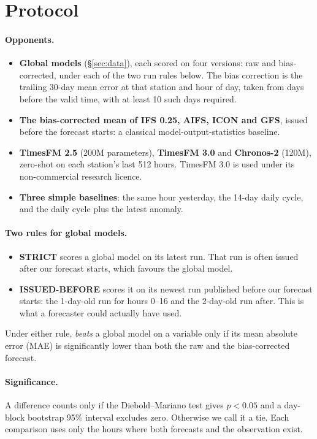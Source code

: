 \section{Protocol}\label{sec:protocol}

\paragraph{Opponents.}
\begin{itemize}
\item \textbf{Global models} (\S\ref{sec:data}), each scored on four versions: raw and bias-corrected, under each of
the two run rules below. The bias correction is the trailing 30-day mean error at that station and hour of day,
taken from days before the valid time, with at least 10 such days required.
\item \textbf{The bias-corrected mean of IFS 0.25, AIFS, ICON and GFS}, issued before the forecast starts: a
classical model-output-statistics baseline.
\item \textbf{TimesFM 2.5} (200M parameters), \textbf{TimesFM 3.0} and \textbf{Chronos-2} (120M), zero-shot on each
station's last 512 hours. TimesFM 3.0 is used under its non-commercial research licence.
\item \textbf{Three simple baselines}: the same hour yesterday, the 14-day daily cycle, and the daily cycle plus the
latest anomaly.
\end{itemize}

\paragraph{Two rules for global models.}
\begin{itemize}
\item \textbf{STRICT} scores a global model on its latest run. That run is often issued after our forecast starts,
which favours the global model.
\item \textbf{ISSUED-BEFORE} scores it on its newest run published before our forecast starts: the 1-day-old run for
hours 0--16 and the 2-day-old run after. This is what a forecaster could actually have used.
\end{itemize}
Under either rule, \pwm \emph{beats} a global model on a variable only if its mean absolute error (MAE) is
significantly lower than both the raw and the bias-corrected forecast.

\paragraph{Significance.}
A difference counts only if the Diebold--Mariano test \citep{diebold1995dm} gives $p<0.05$ and a day-block bootstrap
\citep{kunsch1989bootstrap} 95\% interval excludes zero. Otherwise we call it a tie. Each comparison uses only the
hours where both forecasts and the observation exist.

